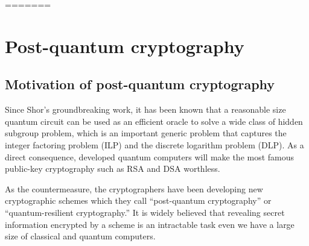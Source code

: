 




	







=======
\clearpage 

\section{Post-quantum cryptography}

\subsection{Motivation of post-quantum cryptography}

Since Shor's groundbreaking work, 
it has been known that a reasonable size quantum circuit can be used as 
an efficient oracle to solve a wide class of hidden subgroup problem,
which is an important generic problem that captures 
the integer factoring problem (ILP)  and the discrete logarithm problem (DLP). 
As a direct consequence, developed quantum computers will make 
the most famous public-key cryptography such as RSA and DSA worthless. 

As the countermeasure, the cryptographers have been developing 
new cryptographic schemes which they call ``post-quantum cryptography''
or ``quantum-resilient cryptography.'' 
It is widely believed that revealing secret information encrypted by a scheme is an intractable task even we have a large size of classical and quantum computers.


